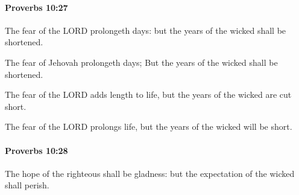 		\paragraph{Proverbs 10:27} %
			\label{PROVERBS-10-27}

			The fear of the LORD prolongeth days: but the years of the wicked shall be shortened.

			\begin{versebox}
					\item[BHS] 
					\item[ASV] The fear of Jehovah prolongeth days; But the years of the wicked shall be shortened.
					\item[NIV] The fear of the LORD adds length to life, but the years of the wicked are cut short.
					\item[NRSV] The fear of the LORD prolongs life, but the years of the wicked will be short.
			\end{versebox}

		\paragraph{Proverbs 10:28} %
			\label{PROVERBS-10-28}

			The hope of the righteous shall be gladness: but the expectation of the wicked shall perish.

